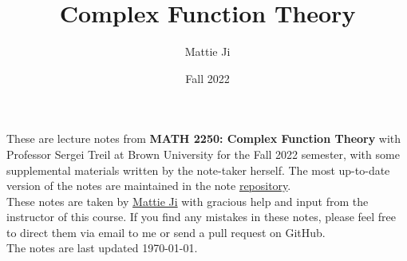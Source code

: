 \documentclass{article}
\title{Complex Function Theory}
\author{Mattie Ji}
\date{Fall 2022}
\begin{document}
\maketitle
These are lecture notes from \textbf{MATH 2250: Complex Function Theory} with Professor Sergei Treil at Brown University for the Fall 2022 semester, with some supplemental materials written by the note-taker herself. The most up-to-date version of the notes are maintained in the note \href{https://github.com/maroon-scorch/MATH2550-notes}{repository}.\\

These notes are taken by \href{https://github.com/maroon-scorch}{Mattie Ji} with gracious help and input from the instructor of this course. If you find any mistakes in these notes, please feel free to direct them via email to me or send a pull request on GitHub.\\

The notes are last updated \today.
\tableofcontents
\newpage


















\end{document}
